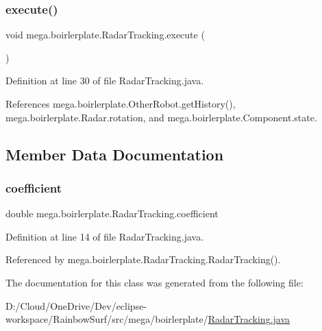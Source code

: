 \subsubsection{\texorpdfstring{execute()}{execute()}}
{\footnotesize\ttfamily void mega.\+boirlerplate.\+Radar\+Tracking.\+execute (\begin{DoxyParamCaption}{ }\end{DoxyParamCaption})}



Definition at line 30 of file Radar\+Tracking.\+java.



References mega.\+boirlerplate.\+Other\+Robot.\+get\+History(), mega.\+boirlerplate.\+Radar.\+rotation, and mega.\+boirlerplate.\+Component.\+state.



\subsection{Member Data Documentation}
\mbox{\label{classmega_1_1boirlerplate_1_1_radar_tracking_ab2858537068dfb781c839ce96b2363c2}} 
\subsubsection{\texorpdfstring{coefficient}{coefficient}}
{\footnotesize\ttfamily double mega.\+boirlerplate.\+Radar\+Tracking.\+coefficient\hspace{0.3cm}{\ttfamily [private]}}



Definition at line 14 of file Radar\+Tracking.\+java.



Referenced by mega.\+boirlerplate.\+Radar\+Tracking.\+Radar\+Tracking().



The documentation for this class was generated from the following file\+:\begin{DoxyCompactItemize}
\item 
D\+:/\+Cloud/\+One\+Drive/\+Dev/eclipse-\/workspace/\+Rainbow\+Surf/src/mega/boirlerplate/\hyperlink{_radar_tracking_8java}{Radar\+Tracking.\+java}\end{DoxyCompactItemize}
